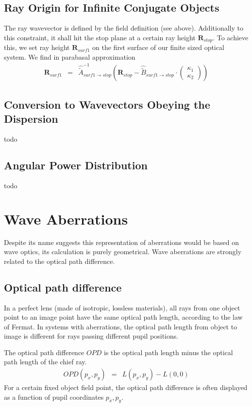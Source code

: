 \documentclass[12pt,a4paper,twoside,openright,BCOR10mm,headsepline,titlepage,abstracton,chapterprefix,final]{scrreprt}
\newcommand\Vector[1]{{\mathbf{#1}}}
\begin{document}
\subsection{Ray Origin for Infinite Conjugate Objects}
The ray wavevector is defined by the field definition (see above).
Additionally to this constraint, it shall hit the stop plane at a certain ray height $\Vector{R}_{stop}$.
To achieve this, we set ray height $\Vector{R}_{surf1}$ on the first surface of our finite sized optical system. 
We find in parabasal approximation
\begin{eqnarray}
 \Vector{R}_{surf1}                 
 &=&
 \hat{\tilde{A}}_{surf1\rightarrow stop}^{-1}
 \left(
   \Vector{R}_{stop} - \hat{\tilde{B}}_{surf1\rightarrow stop} \cdot \begin{pmatrix}\kappa_1 \\ \kappa_2\end{pmatrix}
 \right)
\end{eqnarray}

\subsection{Conversion to Wavevectors Obeying the Dispersion}
todo

\subsection{Angular Power Distribution}
todo

\section{Wave Aberrations}
Despite its name suggests this representation of aberrations would be based on wave optics, its calculation is purely geometrical.
Wave aberrations are strongly related to the optical path difference.

\subsection{Optical path difference}
In a perfect lens (made of isotropic, lossless materials), all rays from one object point to an image point have the same optical path length, according to the law of Fermat. 
In systems with aberrations, the optical path length from object to image is different for rays passing different pupil positions.

The optical path difference $OPD$ is the optical path length minus the optical path length of the chief ray.
\begin{eqnarray}
 OPD(p_x,p_y) &=& L(p_x,p_y) - L(0,0)
\end{eqnarray}
For a certain fixed object field point, the optical path difference is often displayed as a function of pupil coordinates $p_x,p_y$.
\end{document}
